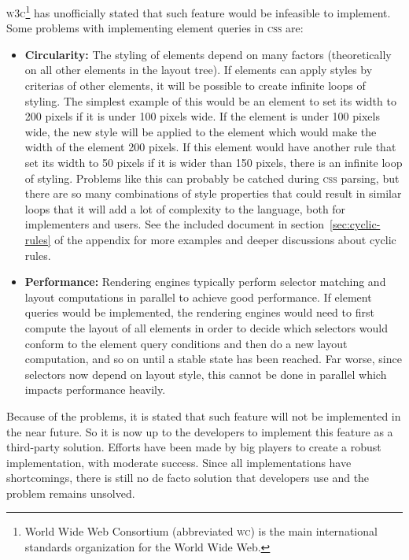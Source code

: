 \documentclass[oneside,a4paper,11pt]{kth-mag}
\begin{document}
\textsc{w3c}\footnote{World Wide Web Consortium (abbreviated \textsc{w}\textsc{c}) is the main international standards organization for the World Wide Web.} has unofficially stated that such feature would be infeasible to implement.
Some problems with implementing element queries in \textsc{css} are:
\begin{itemize}
    \item \textbf{Circularity:} The styling of elements depend on many factors (theoretically on all other elements in the layout tree).
    If elements can apply styles by criterias of other elements, it will be possible to create infinite loops of styling.
    The simplest example of this would be an element to set its width to 200 pixels if it is under 100 pixels wide.
    If the element is under 100 pixels wide, the new style will be applied to the element which would make the width of the element 200 pixels.
    If this element would have another rule that set its width to 50 pixels if it is wider than 150 pixels, there is an infinite loop of styling.
    Problems like this can probably be catched during \textsc{css} parsing, but there are so many combinations of style properties that could result in similar loops that it will add a lot of complexity to the language, both for implementers and users.
    See the included document in section~\ref{sec:cyclic-rules} of the appendix for more examples and deeper discussions about cyclic rules.
    \item \textbf{Performance:} Rendering engines typically perform selector matching and layout computations in parallel to achieve good performance.
    If element queries would be implemented, the rendering engines would need to first compute the layout of all elements in order to decide which selectors would conform to the element query conditions and then do a new layout computation, and so on until a stable state has been reached.
    Far worse, since selectors now depend on layout style, this cannot be done in parallel which impacts performance heavily.
\end{itemize}
Because of the problems, it is stated that such feature will not be implemented in the near future. So it is now up to the developers to implement this feature as a third-party solution. 
Efforts have been made by big players to create a robust implementation, with moderate success. 
Since all implementations have shortcomings, there is still no de facto solution that developers use and the problem remains unsolved.
\end{document}
